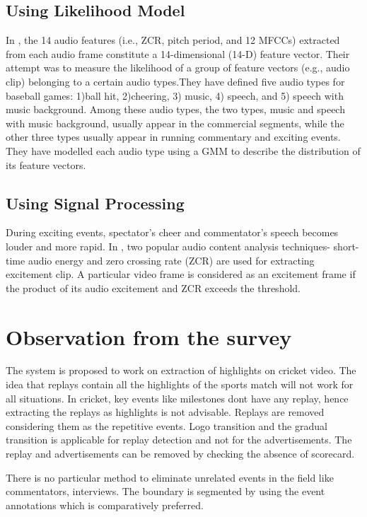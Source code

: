 \subsection{Using Likelihood Model}
 In \cite{1632043}, the 14 audio features (i.e., ZCR, pitch period, and 12 MFCCs) extracted from each audio frame constitute a 14-dimensional (14-D) feature vector. 
 Their attempt was to measure the likelihood of a group of feature vectors (e.g., audio clip) belonging to a certain audio types.They have deﬁned ﬁve audio types for baseball games: 1)ball hit, 2)cheering, 3) music, 4) speech, and 5) speech with music background. Among these audio types, the two types, music and speech with music background, usually appear in the commercial segments, while the other three types usually appear in running commentary and exciting events. They have modelled each audio type using a GMM to describe the distribution of its feature vectors.  
\subsection{Using Signal Processing}
During exciting events, spectator’s cheer and commentator’s speech becomes louder and more rapid. In \cite{4756096,canalysis}, two popular audio content analysis techniques- short-time audio energy and zero crossing rate (ZCR) are used for extracting excitement clip.  A particular video frame is considered as an excitement frame if the product of its audio excitement and ZCR exceeds the threshold.

\section{Observation from the survey}

The system is proposed to work on extraction of highlights on cricket video. 
The idea that replays contain all the highlights of the sports match will not work for all situations. In cricket, key events like milestones don\textquotesingle t have any replay, hence extracting the replays as highlights is not advisable. Replays are removed considering them as the repetitive  events. Logo transition and the gradual transition is applicable for replay detection and not for the advertisements. The replay and advertisements can be removed by checking the absence of scorecard.

There is no particular method to eliminate unrelated events in the field like commentators, interviews. The boundary is segmented by using the event annotations which is comparatively preferred. 

